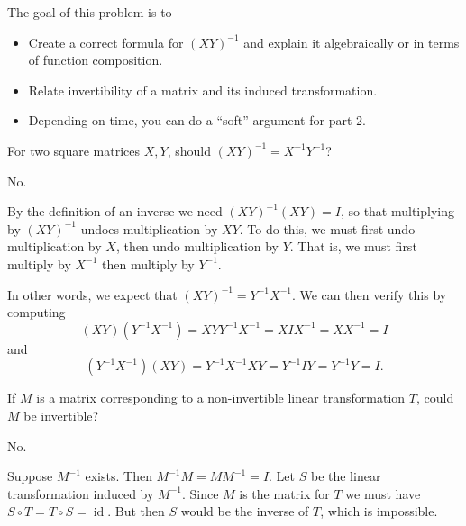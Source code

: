 \documentclass{problemset}
\DeclareMathOperator{\Id}{id}
\begin{document}
	\question
	\begin{annotation}
		\begin{goals}

			The goal of this problem is to
			\begin{itemize}
				\item Create a correct formula for $(XY)^{-1}$ and
					explain it algebraically or in terms of 
					function composition.
				\item Relate invertibility of a matrix and its induced transformation.
			\end{itemize}
		\end{goals}

		\begin{notes}
			\begin{itemize}
				\item Depending on time, you can do a ``soft'' argument for part 2.
			\end{itemize}
		\end{notes}
	\end{annotation}
	\begin{parts}
		\item For two square matrices $X,Y$, should $(XY)^{-1}=X^{-1}Y^{-1}$?
			\begin{solution}
				No.

				By the definition of an inverse we need $(XY)^{-1}(XY)=I$, so
				that multiplying by $(XY)^{-1}$ undoes multiplication
				by $XY$. To do this, we must first undo multiplication by $X$,
				then undo multiplication by $Y$. That is, we must first multiply
				by $X^{-1}$ then multiply by $Y^{-1}$.

				In other words, we expect that $(XY)^{-1} = Y^{-1}X^{-1}$. We can
				then verify this by computing
				\[
					(XY)(Y^{-1}X^{-1}) = XYY^{-1}X^{-1} = XIX^{-1} = XX^{-1} = I
				\]
				and
				\[
					(Y^{-1}X^{-1})(XY) = Y^{-1}X^{-1}XY = Y^{-1}IY = Y^{-1}Y = I.
				\]
			\end{solution}
		\item If $M$ is a matrix corresponding to a non-invertible linear transformation $T$,
			could $M$ be invertible?
			\begin{solution}
				No.

				Suppose $M^{-1}$ exists. Then $M^{-1}M=MM^{-1}=I$.
				Let $S$ be the linear transformation induced by $M^{-1}$.
				Since $M$ is the matrix for $T$ we must have $S\circ T=T\circ S=\Id$. But
				then $S$ would be the inverse of $T$, which is impossible.
			\end{solution}
	\end{parts}
\end{document}
